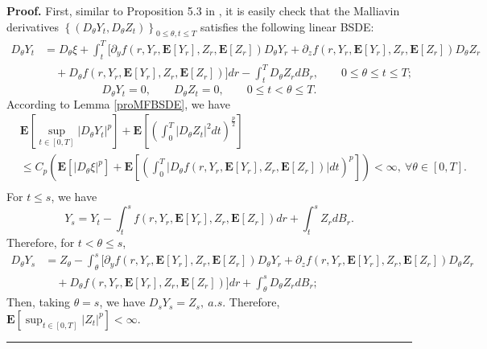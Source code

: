 \documentclass[10pt]{article}%
\numberwithin{equation}{section}
\newenvironment{proof}[1][Proof]{\noindent \textbf{#1.} }{\  \rule{0.5em}{0.5em}}
\begin{document}
\begin{proof}
      First, similar to Proposition 5.3 in \cite{EPQ}, it is easily check that the Malliavin derivatives $\left\{(D_{\theta}Y_t,D_{\theta}Z_t)\right\}_{0\leq \theta,t\leq T}$ satisfies the following linear BSDE:  
\begin{equation}\label{eqDYDZ}
\begin{split}
D_\theta Y_t &= D_\theta \xi + \int_t^T \Big[ \partial_y f(r,Y_r,\mathbf{E}[Y_r],Z_r,\mathbf{E}[Z_r])D_\theta Y_r+\partial_z f(r,Y_r,\mathbf{E}[Y_r],Z_r,\mathbf{E}[Z_r]) D_\theta Z_r \\
&\quad+ D_\theta f(r,Y_r,\mathbf{E}[Y_r],Z_r,\mathbf{E}[Z_r]) \Big] dr-\int_t^T D_\theta Z_r dB_r, \qquad 0 \leq \theta \leq t \leq T;
\end{split}
\end{equation}
\begin{equation}\label{eqDYDZ0}
D_\theta Y_t = 0, \qquad D_\theta Z_t = 0, \qquad 0 \leq t < \theta \leq T.
\end{equation}
According to Lemma \ref{proMFBSDE}, we have 
\begin{equation}\label{eqDYDZ1}
\begin{split}
&\mathbf{E}\left[\sup_{t\in[0,T]}\left|D_{\theta}Y_t\right|^p\right]+\mathbf{E}\left[\left(\int_{0}^{T}\left|D_{\theta}Z_t\right|^2dt\right)^{\frac{p}{2}}\right]\\
&\leq C_p\left(\mathbf{E}\left[\left|D_{\theta}\xi\right|^p\right]+\mathbf{E}\left[\left(\int_{0}^{T}|D_{\theta}f(r,Y_r,\mathbf{E}[Y_r],Z_r,\mathbf{E}[Z_r])|dt\right)^{p}\right]\right)<\infty, \  \forall \theta\in[0,T].\\
\end{split}
\end{equation}
For $t\leq s$, we have
$$Y_s=Y_t-\int_{t}^{s}f(r,Y_r,\mathbf{E}[Y_r],Z_r,\mathbf{E}[Z_r])dr+\int_{t}^{s}Z_rdB_r.$$
Therefore, for $t< \theta \leq s$,
\begin{equation}
\begin{split}
D_\theta Y_s &= Z_{\theta}- \int_{\theta}^{s} \Big[ \partial_y f(r,Y_r,\mathbf{E}[Y_r],Z_r,\mathbf{E}[Z_r])D_\theta Y_r+\partial_z f(r,Y_r,\mathbf{E}[Y_r],Z_r,\mathbf{E}[Z_r]) D_\theta Z_r \\
&\quad+ D_\theta f(r,Y_r,\mathbf{E}[Y_r],Z_r,\mathbf{E}[Z_r]) \Big] dr+\int_{\theta}^{s} D_\theta Z_r dB_r;
\end{split}
\end{equation}
Then, taking $\theta=s$, we have $D_sY_s=Z_s, \ a.s.$  Therefore,  $\mathbf{E}\left[\sup_{t\in[0,T]}\left|Z_t\right|^p\right]<\infty$.
\end{proof}
 
\end{document}
